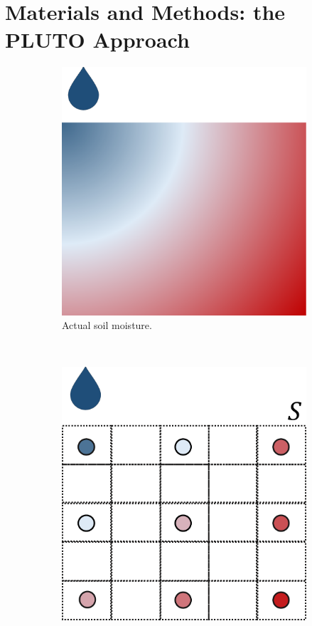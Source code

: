 \section{Materials and Methods: the PLUTO Approach}
\label{pluto-sec:MaterialsAndMethods}
\begin{figure}[t]
\centering
\begin{subfigure}[t]{.3\textwidth}
\centering
\includegraphics[scale=.15]{chapters/physics-aware/pluto/img/soil-moisture-continuous.pdf}
\caption{Actual soil moisture.}
\label{pluto-fig:moisture-cont}
\end{subfigure}~
\begin{subfigure}[t]{.3\textwidth}
\centering
\includegraphics[scale=.15]{chapters/physics-aware/pluto/img/soil-moisture-sample.pdf}

\end{subfigure}
\end{figure}
